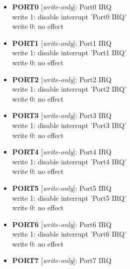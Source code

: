 \begin{itemize}
\item \begin{small}
{\bf 
PORT0
} [\emph{write-only}]: Port0 IRQ
\\
write 1: disable interrupt 'Port0 IRQ'\\write 0: no effect
\end{small}
\item \begin{small}
{\bf 
PORT1
} [\emph{write-only}]: Port1 IRQ
\\
write 1: disable interrupt 'Port1 IRQ'\\write 0: no effect
\end{small}
\item \begin{small}
{\bf 
PORT2
} [\emph{write-only}]: Port2 IRQ
\\
write 1: disable interrupt 'Port2 IRQ'\\write 0: no effect
\end{small}
\item \begin{small}
{\bf 
PORT3
} [\emph{write-only}]: Port3 IRQ
\\
write 1: disable interrupt 'Port3 IRQ'\\write 0: no effect
\end{small}
\item \begin{small}
{\bf 
PORT4
} [\emph{write-only}]: Port4 IRQ
\\
write 1: disable interrupt 'Port4 IRQ'\\write 0: no effect
\end{small}
\item \begin{small}
{\bf 
PORT5
} [\emph{write-only}]: Port5 IRQ
\\
write 1: disable interrupt 'Port5 IRQ'\\write 0: no effect
\end{small}
\item \begin{small}
{\bf 
PORT6
} [\emph{write-only}]: Port6 IRQ
\\
write 1: disable interrupt 'Port6 IRQ'\\write 0: no effect
\end{small}
\item \begin{small}
{\bf 
PORT7
} [\emph{write-only}]: Port7 IRQ
\\

\end{small}
\end{itemize}
